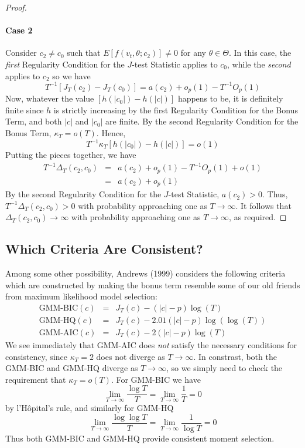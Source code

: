 \begin{proof}
\paragraph{Case 2} Consider $c_2 \neq c_0$ such that $E[f(v_t, \theta; c_2)]\neq 0$ for any $\theta \in \Theta$. In this case, the \emph{first} Regularity Condition for the $J$-test Statistic applies to $c_0$, while the \emph{second} applies to $c_2$ so we have
	$$T^{-1}\left[J_T(c_2) - J_T(c_0) \right] = a(c_2) + o_p(1) - T^{-1} O_p(1)$$
Now, whatever the value $\left[h(|c_0|) - h(|c|) \right]$ happens to be, it is definitely finite since $h$ is strictly increasing by the first Regularity Condition for the Bonus Term, and both $|c|$ and $|c_0|$ are finite. By the second Regularity Condition for the Bonus Term, $\kappa_T = o(T)$. Hence,
	$$T^{-1} \kappa_T\left[h(|c_0|) - h(|c|) \right] = o(1)$$
Putting the pieces together, we have
\begin{eqnarray*}
	T^{-1} \Delta_T(c_2, c_0) &=& a(c_2) + o_p(1) - T^{-1}O_p(1) + o(1)\\
	&=& a(c_2) + o_p(1)
\end{eqnarray*}
By the second Regularity Condition for the $J$-test Statistic, $a(c_2) >0$. Thus, $T^{-1}\Delta_T(c_2,c_0) >0$ with probability approaching one as $T\rightarrow \infty$. It follows that $\Delta_T(c_2,c_0)  \rightarrow \infty$ with probability approaching one as $T\rightarrow \infty$, as required.
\end{proof}

\subsection{Which Criteria Are Consistent?}
Among some other possibility, Andrews (1999) considers the following criteria which are constructed by making the bonus term resemble some of our old friends from maximum likelihood model selection:
\begin{eqnarray*}
	\mbox{GMM-BIC}(c) &=& J_T(c) - \left(|c| - p\right)\log(T)\\
	\mbox{GMM-HQ}(c) &=& J_T(c) - 2.01\left(|c| - p\right)\log(\log(T))\\
	\mbox{GMM-AIC}(c) &=& J_T(c) - 2\left(|c| - p\right)\log(T)
\end{eqnarray*}
We see immediately that GMM-AIC does \emph{not} satisfy the necessary conditions for consistency, since $\kappa_T = 2$ does not diverge as $T\rightarrow \infty$. In constrast, both the GMM-BIC and GMM-HQ diverge as $T\rightarrow \infty$, so we simply need to check the requirement that $\kappa_T = o(T)$. For GMM-BIC we have 
	$$\lim_{T \rightarrow \infty} \frac{\log T}{T} = \lim_{T \rightarrow \infty} \frac{1}{T} = 0$$
by l'H\^{o}pital's rule, and similarly for GMM-HQ
	$$\lim_{T \rightarrow \infty} \frac{\log \log T}{T} = \lim_{T \rightarrow \infty} \frac{1}{\log T} = 0$$
Thus both GMM-BIC and GMM-HQ provide consistent moment selection.
 
